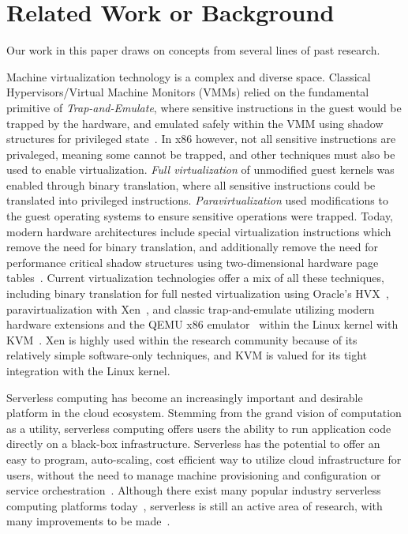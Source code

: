 \section{Related Work or Background} \label{sec:related}
Our work in this paper draws on concepts from several lines of past research.

 Machine virtualization technology is
a complex and diverse space. Classical Hypervisors/Virtual Machine Monitors
(VMMs) relied on the fundamental primitive of \emph{Trap-and-Emulate}, where
sensitive instructions in the guest would be trapped by the hardware, and
emulated safely within the VMM using shadow structures for privileged
state~\cite{classic-virt}. In x86 however, not all sensitive instructions are
privaleged, meaning some cannot be trapped, and other techniques must also be used
to enable virtualization. \emph{Full virtualization} of unmodified guest
kernels was enabled through binary translation, where all sensitive
instructions could be translated into privileged instructions.
\emph{Paravirtualization} used modifications to the guest operating systems to
ensure sensitive operations were trapped. Today, modern hardware architectures
include special virtualization instructions which remove the need for binary
translation, and additionally remove the need for performance critical shadow
structures using two-dimensional hardware page tables~\cite{virt-techniques}.
Current virtualization technologies offer a mix of all these techniques,
including binary translation for full nested virtualization using Oracle's
HVX~\cite{hvx}, paravirtualization with Xen~\cite{xen}, and classic
trap-and-emulate utilizing modern hardware extensions and the QEMU x86
emulator~\cite{qemu} within the Linux kernel with KVM~\cite{kvm}. Xen is highly
used within the research community because of its relatively simple
software-only techniques, and KVM is valued for its tight integration with the
Linux kernel.

 Serverless computing has become an
increasingly important and desirable platform in the cloud ecosystem. Stemming
from the grand vision of computation as a utility, serverless computing offers
users the ability to run application code directly on a black-box
infrastructure. Serverless has the potential to offer an easy to program,
auto-scaling, cost efficient way to utilize cloud infrastructure for users,
without the need to manage machine provisioning and configuration or service
orchestration~\cite{berkeley-serverless}. Although there exist many popular
industry serverless computing platforms
today~\cite{lambda}\cite{gcf}\cite{azure-cf}\cite{openwhisk}, serverless is
still an active area of research, with many improvements to be
made~\cite{peeking}\cite{trilemma}\cite{steps-back}.

